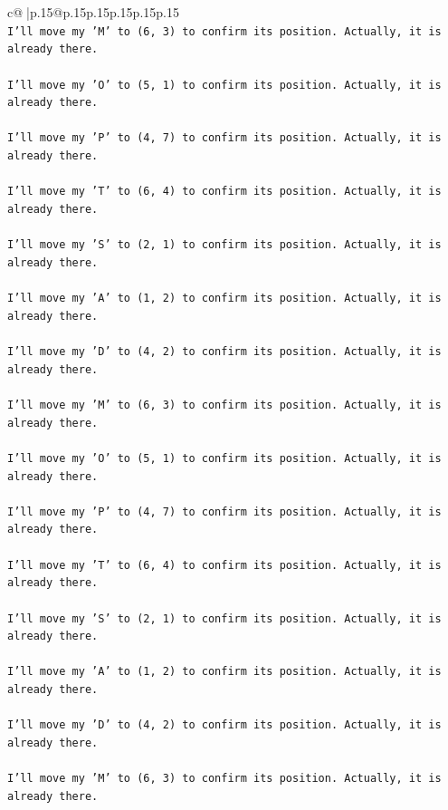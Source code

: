\documentclass{article}
\begin{document}
{\begin{supertabular}{c@{$\;$}|p{.15\linewidth}@{}p{.15\linewidth}p{.15\linewidth}p{.15\linewidth}p{.15\linewidth}p{.15\linewidth}}
{{{\\ 
\texttt{I'll move my 'M' to (6, 3) to confirm its position. Actually, it is already there.} \\
\\ 
\texttt{I'll move my 'O' to (5, 1) to confirm its position. Actually, it is already there.} \\
\\ 
\texttt{I'll move my 'P' to (4, 7) to confirm its position. Actually, it is already there.} \\
\\ 
\texttt{I'll move my 'T' to (6, 4) to confirm its position. Actually, it is already there.} \\
\\ 
\texttt{I'll move my 'S' to (2, 1) to confirm its position. Actually, it is already there.} \\
\\ 
\texttt{I'll move my 'A' to (1, 2) to confirm its position. Actually, it is already there.} \\
\\ 
\texttt{I'll move my 'D' to (4, 2) to confirm its position. Actually, it is already there.} \\
\\ 
\texttt{I'll move my 'M' to (6, 3) to confirm its position. Actually, it is already there.} \\
\\ 
\texttt{I'll move my 'O' to (5, 1) to confirm its position. Actually, it is already there.} \\
\\ 
\texttt{I'll move my 'P' to (4, 7) to confirm its position. Actually, it is already there.} \\
\\ 
\texttt{I'll move my 'T' to (6, 4) to confirm its position. Actually, it is already there.} \\
\\ 
\texttt{I'll move my 'S' to (2, 1) to confirm its position. Actually, it is already there.} \\
\\ 
\texttt{I'll move my 'A' to (1, 2) to confirm its position. Actually, it is already there.} \\
\\ 
\texttt{I'll move my 'D' to (4, 2) to confirm its position. Actually, it is already there.} \\
\\ 
\texttt{I'll move my 'M' to (6, 3) to confirm its position. Actually, it is already there.} \\
}}}
\end{supertabular}}
\end{document}
